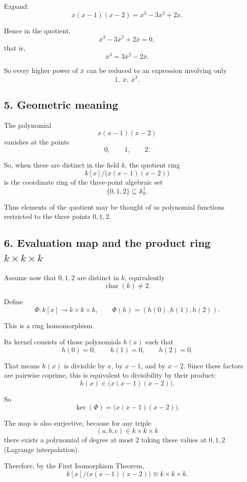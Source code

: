 \documentclass[12pt,a4paper]{article}
\theoremstyle{notespace}
\begin{document}
Expand:
\[
x(x-1)(x-2)=x^3-3x^2+2x.
\]

Hence in the quotient,
\[
\bar x^3-3\bar x^2+2\bar x=0,
\]
that is,
\[
\bar x^3=3\bar x^2-2\bar x.
\]

So every higher power of \(\bar x\) can be reduced to an expression involving only
\[
1,\ \bar x,\ \bar x^2.
\]

\subsection*{5. Geometric meaning}

The polynomial
\[
x(x-1)(x-2)
\]
vanishes at the points
\[
0,\qquad 1,\qquad 2.
\]

So, when these are distinct in the field \(k\), the quotient ring
\[
k[x]/\bigl(x(x-1)(x-2)\bigr)
\]
is the coordinate ring of the three-point algebraic set
\[
\{0,1,2\}\subseteq \mathbb A_k^1.
\]

Thus elements of the quotient may be thought of as polynomial functions restricted to the three points \(0,1,2\).

\subsection*{6. Evaluation map and the product ring \(k\times k\times k\)}

Assume now that \(0,1,2\) are distinct in \(k\), equivalently
\[
\operatorname{char}(k)\neq 2.
\]

Define
\[
\Phi:k[x]\longrightarrow k\times k\times k,
\qquad
\Phi(h)=(h(0),h(1),h(2)).
\]

This is a ring homomorphism.

Its kernel consists of those polynomials \(h(x)\) such that
\[
h(0)=0,\qquad h(1)=0,\qquad h(2)=0.
\]

That means \(h(x)\) is divisible by \(x\), by \(x-1\), and by \(x-2\). Since these factors are pairwise coprime, this is equivalent to divisibility by their product:
\[
h(x)\in \bigl(x(x-1)(x-2)\bigr).
\]

So
\[
\ker(\Phi)=\bigl(x(x-1)(x-2)\bigr).
\]

The map is also surjective, because for any triple
\[
(a,b,c)\in k\times k\times k
\]
there exists a polynomial of degree at most \(2\) taking these values at \(0,1,2\) (Lagrange interpolation).

Therefore, by the First Isomorphism Theorem,
\[
k[x]/\bigl(x(x-1)(x-2)\bigr)\cong k\times k\times k.
\]
\end{document}
